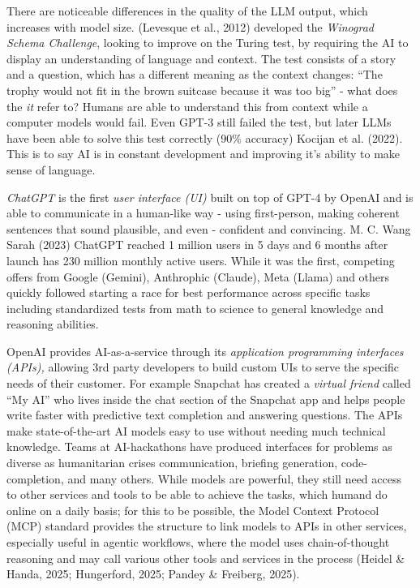 \documentclass[
  12pt,
  letterpaper,
  DIV=11,
  numbers=noendperiod]{scrartcl}
\begin{document}
There are noticeable differences in the quality of the LLM output, which
increases with model size. (Levesque et al., 2012) developed the
\emph{Winograd Schema Challenge}, looking to improve on the Turing test,
by requiring the AI to display an understanding of language and context.
The test consists of a story and a question, which has a different
meaning as the context changes: ``The trophy would not fit in the brown
suitcase because it was too big'' - what does the \emph{it} refer to?
Humans are able to understand this from context while a computer models
would fail. Even GPT-3 still failed the test, but later LLMs have been
able to solve this test correctly (90\% accuracy) Kocijan et al. (2022).
This is to say AI is in constant development and improving it's ability
to make sense of language.

\emph{ChatGPT} is the first \emph{user interface (UI)} built on top of
GPT-4 by OpenAI and is able to communicate in a human-like way - using
first-person, making coherent sentences that sound plausible, and even -
confident and convincing. M. C. Wang Sarah (2023) ChatGPT reached 1
million users in 5 days and 6 months after launch has 230 million
monthly active users. While it was the first, competing offers from
Google (Gemini), Anthrophic (Claude), Meta (Llama) and others quickly
followed starting a race for best performance across specific tasks
including standardized tests from math to science to general knowledge
and reasoning abilities.

OpenAI provides AI-as-a-service through its \emph{application
programming interfaces (APIs),} allowing 3rd party developers to build
custom UIs to serve the specific needs of their customer. For example
Snapchat has created a \emph{virtual friend} called ``My AI'' who lives
inside the chat section of the Snapchat app and helps people write
faster with predictive text completion and answering questions. The APIs
make state-of-the-art AI models easy to use without needing much
technical knowledge. Teams at AI-hackathons have produced interfaces for
problems as diverse as humanitarian crises communication, briefing
generation, code-completion, and many others. While models are powerful,
they still need access to other services and tools to be able to achieve
the tasks, which humand do online on a daily basis; for this to be
possible, the Model Context Protocol (MCP) standard provides the
structure to link models to APIs in other services, especially useful in
agentic workflows, where the model uses chain-of-thought reasoning and
may call various other tools and services in the process (Heidel \&
Handa, 2025; Hungerford, 2025; Pandey \& Freiberg, 2025).
\end{document}
